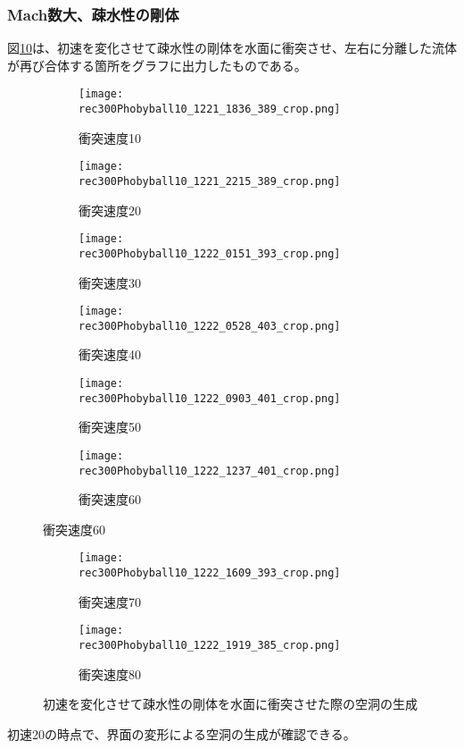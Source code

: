 \documentclass[]{jsarticle}
\begin{document}
\subsubsection{Mach数大、疎水性の剛体}
\label{subsec:MLPhoby}
図\ref{fig:MachLPhoby}は、初速を変化させて疎水性の剛体を水面に衝突させ、左右に分離した流体が再び合体する箇所をグラフに出力したものである。
\begin{figure}[H]
  \centering
\begin{subfigure}{0.3\columnwidth}
  \centering
  \texttt{[image: rec300Phobyball10\_1221\_1836\_389\_crop.png]}
  \caption{衝突速度10}
  \label{fig:vel10}
\end{subfigure}
\begin{subfigure}{0.3\columnwidth}
  \centering
  \texttt{[image: rec300Phobyball10\_1221\_2215\_389\_crop.png]}
  \caption{衝突速度20}
  \label{fig:vel20}
\end{subfigure}
\begin{subfigure}{0.3\columnwidth}
  \centering
  \texttt{[image: rec300Phobyball10\_1222\_0151\_393\_crop.png]}
  \caption{衝突速度30}
  \label{fig:vel30}
\end{subfigure}
\begin{subfigure}{0.3\columnwidth}
  \centering
  \texttt{[image: rec300Phobyball10\_1222\_0528\_403\_crop.png]}
  \caption{衝突速度40}
  \label{fig:vel40}
\end{subfigure}
\begin{subfigure}{0.3\columnwidth}
  \centering
  \texttt{[image: rec300Phobyball10\_1222\_0903\_401\_crop.png]}
  \caption{衝突速度50}
  \label{fig:vel50}
\end{subfigure}
\begin{subfigure}{0.3\columnwidth}
  \centering
  \texttt{[image: rec300Phobyball10\_1222\_1237\_401\_crop.png]}
  \caption{衝突速度60}
  \label{fig:vel60}
\end{subfigure}
\end{figure}

\clearpage
\begin{figure}
\ContinuedFloat
  \begin{subfigure}{0.3\columnwidth}
  \centering
  \texttt{[image: rec300Phobyball10\_1222\_1609\_393\_crop.png]}
  \caption{衝突速度70}
  \label{fig:vel70}
\end{subfigure}
\begin{subfigure}{0.3\columnwidth}
  \centering
  \texttt{[image: rec300Phobyball10\_1222\_1919\_385\_crop.png]}
  \caption{衝突速度80}
  \label{fig:vel80}
\end{subfigure}
\caption{初速を変化させて疎水性の剛体を水面に衝突させた際の空洞の生成}
\label{fig:MachLPhoby}
\end{figure}
初速20の時点で、界面の変形による空洞の生成が確認できる。
\end{document}
